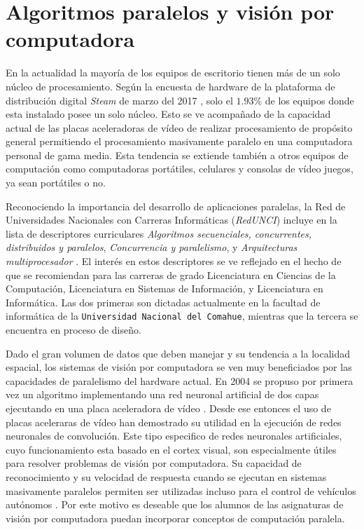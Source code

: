 
\section{Algoritmos paralelos y visión por computadora}

\label{algoritmosParalelosYVision}

En la actualidad la mayoría de los equipos de escritorio tienen más de un solo
núcleo de procesamiento. Según la encuesta de hardware de la plataforma de
distribución digital \emph{Steam} de marzo del 2017 \cite{steamSurvey}, solo
el $1.93$\% de los equipos donde esta instalado posee un solo núcleo. Esto se
ve acompañado de la capacidad actual de las placas aceleradoras de vídeo de
realizar procesamiento de propósito general permitiendo el procesamiento
masivamente paralelo en una computadora personal de gama media. Esta tendencia
se extiende también a otros equipos de computación como computadoras
portátiles, celulares y consolas de vídeo juegos, ya sean portátiles o no.

Reconociendo la importancia del desarrollo de aplicaciones paralelas, la Red
de Universidades Nacionales con Carreras Informáticas (\emph{RedUNCI}) incluye
en la lista de descriptores curriculares \emph{Algoritmos secuenciales,
concurrentes, distribuidos y paralelos}, \emph{Concurrencia y paralelismo}, y
\emph{Arquitecturas multiprocesador} \cite{RedUNCI2015}. El interés en estos
descriptores se ve reflejado en el hecho de que se recomiendan para las
carreras de grado Licenciatura en Ciencias de la Computación, Licenciatura en
Sistemas de Información, y Licenciatura en Informática. Las dos primeras son
dictadas actualmente en la facultad de informática de la \texttt{Universidad
Nacional del Comahue}, mientras que la tercera se encuentra en proceso de
diseño.

Dado el gran volumen de datos que deben manejar y su tendencia a la localidad
espacial, los sistemas de visión por computadora se ven muy beneficiados por
las capacidades de paralelismo del hardware actual. En 2004 se propuso por
primera vez un algoritmo implementando una red neuronal artificial de dos
capas ejecutando en una placa aceleradora de vídeo \cite{GPUforMLA}. Desde ese
entonces el uso de placas aceleraras de vídeo han demostrado su utilidad en la
ejecución de redes neuronales de convolución. Este tipo especifico de redes
neuronales artificiales, cuyo funcionamiento esta basado en el cortex visual,
son especialmente útiles para resolver problemas de visión por computadora. Su
capacidad de reconocimiento y su velocidad de respuesta cuando se ejecutan en
sistemas masivamente paralelos permiten ser utilizadas incluso para el control
de vehículos autónomos \cite{e2eLearning4SDC}. Por este motivo es deseable que
los alumnos de las asignaturas de visión por computadora puedan incorporar
conceptos de computación paralela.
